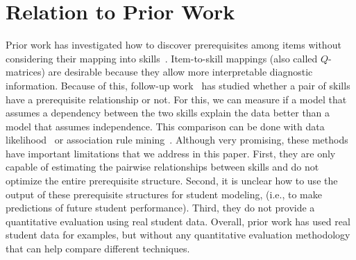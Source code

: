 \documentclass{edm_template}
\newcommand{\hl}[1]{\colorbox{yellow}{#1}}
\begin{document}
\section{Relation to Prior Work}
\label{sec:previous_work}

Prior work has investigated how to discover %
 prerequisites among items without considering their mapping into skills~\cite{desmarais2006learned,vuong2010method}. %
Item-to-skill mappings (also called $Q$-matrices) are desirable because they allow more interpretable diagnostic information.
Because of this, follow-up work~\cite{brunskill2010estimating,chen2015discovering}  has studied whether a pair of skills have a prerequisite relationship or not.
For this,  we can measure if a model that assumes a dependency between the two skills explain the data better than a model that assumes independence. %
This comparison can be done with data likelihood~\cite{brunskill2010estimating} or association rule mining~\cite{chen2015discovering}.
Although very promising, these methods have important limitations that we address in this paper.
First,  they are only capable of estimating the pairwise relationships between skills and do not optimize the entire prerequisite structure.
Second, it is unclear how to use the output of these prerequisite structures for student modeling, (i.e., to make predictions of future student performance).
Third, they do not provide a quantitative evaluation using real student data.
Overall, prior work has used real student data for examples, but without any quantitative evaluation methodology that can help compare different techniques.
\end{document}
